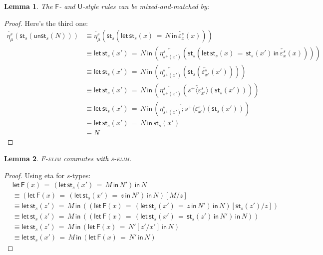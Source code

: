 \documentclass[10pt]{article}
\newtheorem{lemma}{Lemma}
\theoremstyle{definition}
\newcommand{\rewrite}[2]{\overleftarrow{#1}(#2)}
\newcommand\StI[2]{\ensuremath{\mathsf{st}_{#1}(#2)}}
\newcommand\UStI[2]{\ensuremath{\mathsf{ust}_{#1}(#2)}}
\newcommand\UnSt[2]{\ensuremath{\mathsf{unst}_{#1}(#2)}}
\newcommand\StE[4]{\ensuremath{\mathsf{let} \, \StI{#1}{#3} \, = \, {#2} \, \mathsf{in} \, #4}}
\newcommand\FE[3]{\ensuremath{\mathsf{let} \, \mathsf{F}(#2) \, = \, {#1} \, \mathsf{in} \, #3}}
\newcommand\TrPlus[2]{\ensuremath{{#1}^+(#2)}}
\newcommand\ap[2]{\ensuremath{#1 \langle #2 \rangle }}
\newcommand\ApPlus[2]{\ensuremath{{#1}^+ \langle #2 \rangle }}
\begin{document}
\begin{lemma}
The $\mathsf{F}$- and $\mathsf{U}$-style rules can be mixed-and-matched by:
\end{lemma}
\begin{proof}

Here's the third one:
\begin{align*}
\rewrite{\eta^s_{\mu}}{\StI{s}{\UnSt{s}{N}}} 
&\equiv \rewrite{\eta^s_{\mu}}{\StI{s}{\StE{s}{N}{x}{\rewrite{\varepsilon^s_x}{x}}}} \\
&\equiv \StE{s}{N}{x'}{(\rewrite{\eta^s_{\TrPlus{s}{x'}}}{\StI{s}{\StE{s}{\StI{s}{x'}}{x}{\rewrite{\varepsilon^s_x}{x}}}})} \\
&\equiv \StE{s}{N}{x'}{(\rewrite{\eta^s_{\TrPlus{s}{x'}}}{\StI{s}{\rewrite{\varepsilon^s_{x'}}{x'}}})} \\
&\equiv \StE{s}{N}{x'}{(\rewrite{\eta^s_{\TrPlus{s}{x'}}}{\rewrite{\ApPlus{s}{\varepsilon^s_{x'}}}{\StI{s}{x'}}})} \\
&\equiv \StE{s}{N}{x'}{(\rewrite{\eta^s_{\TrPlus{s}{x'}};\ApPlus{s}{\varepsilon^s_{x'}}}{\StI{s}{x'}})} \\
&\equiv \StE{s}{N}{x'}{\StI{s}{x'}} \\
&\equiv N
\end{align*}
\end{proof}

\begin{lemma}
\textsc{F-elim} commutes with \textsc{s-elim}.
\end{lemma}
\begin{proof}
Using eta for $s$-types:
\begin{align*}
&\FE{(\StE{s}{M}{x'}{N'})}{x}{N} \\
&\equiv (\FE{(\StE{s}{z}{x'}{N'})}{x}{N})[M/z] \\
&\equiv \StE{s}{M}{z'}{((\FE{(\StE{s}{z}{x'}{N'})}{x}{N})[\StI{s}{z'}/z])} \\
&\equiv \StE{s}{M}{z'}{((\FE{(\StE{s}{\StI{s}{z'}}{x'}{N'})}{x}{N}))} \\
&\equiv \StE{s}{M}{z'}{(\FE{N'[z'/x']}{x}{N})} \\
&\equiv \StE{s}{M}{x'}{(\FE{N'}{x}{N})}
\end{align*}
\end{proof}
\end{document}
